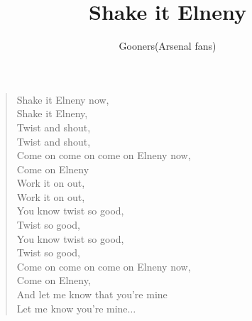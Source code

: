 \documentclass[a4paper,12pt]{article}
\title{Shake it Elneny}
\author{Gooners(Arsenal fans)}
\date{}
\begin{document}
	
	\maketitle
	
	\begin{verse}
		
		Shake it Elneny now, \\
		Shake it Elneny, \\
		Twist and shout, \\
		Twist and shout, \\
		Come on come on come on Elneny now, \\
		Come on Elneny \\
		Work it on out, \\
		Work it on out, \\
		You know twist so good, \\
		Twist so good, \\
		You know twist so good, \\
		Twist so good, \\
		Come on come on come on Elneny now, \\
		Come on Elneny, \\
		And let me know that you're mine \\ 
		Let me know you're mine$\ldots$
		
	\end{verse}
	
\end{document}
